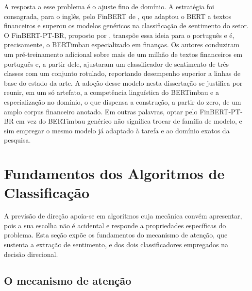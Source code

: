 A resposta a esse problema é o ajuste fino de domínio. A estratégia foi consagrada, para o inglês, pelo FinBERT de , que adaptou o BERT a textos financeiros e superou os modelos genéricos na classificação de sentimento do setor. O FinBERT-PT-BR, proposto por , transpõe essa ideia para o português e é, precisamente, o BERTimbau especializado em finanças. Os autores conduziram um pré-treinamento adicional sobre mais de um milhão de textos financeiros em português e, a partir dele, ajustaram um classificador de sentimento de três classes com um conjunto rotulado, reportando desempenho superior a linhas de base do estado da arte. A adoção desse modelo nesta dissertação se justifica por reunir, em um só artefato, a competência linguística do BERTimbau e a especialização no domínio, o que dispensa a construção, a partir do zero, de um amplo corpus financeiro anotado. Em outras palavras, optar pelo FinBERT-PT-BR em vez do BERTimbau genérico não significa trocar de família de modelo, e sim empregar o mesmo modelo já adaptado à tarefa e ao domínio exatos da pesquisa.

\section{Fundamentos dos Algoritmos de Classificação}

A previsão de direção apoia-se em algoritmos cuja mecânica convém apresentar, pois a sua escolha não é acidental e responde a propriedades específicas do problema. Esta seção expõe os fundamentos do mecanismo de atenção, que sustenta a extração de sentimento, e dos dois classificadores empregados na decisão direcional.

\subsection{O mecanismo de atenção}

